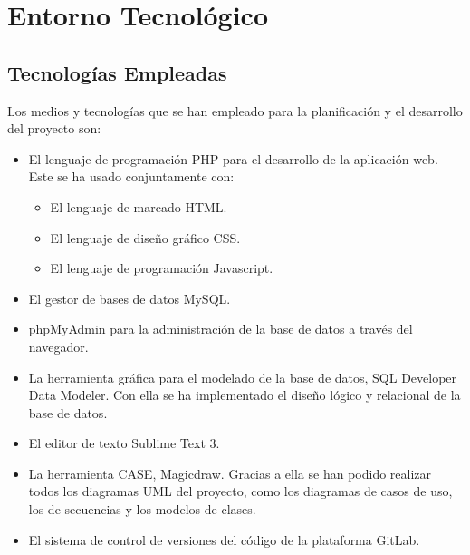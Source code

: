 \chapter{Entorno Tecnol\'ogico}

\section{Tecnolog\'ias Empleadas}
Los medios y tecnologías que se han empleado para la planificación y el desarrollo del proyecto son:
\begin{itemize}
	\item El lenguaje de programación PHP para el desarrollo de la aplicación web. Este se ha usado conjuntamente con:
		\begin{itemize}
			\item El lenguaje de marcado HTML.
			\item El lenguaje de diseño gráfico CSS.
			\item El lenguaje de programación Javascript.
		\end{itemize}
	\item El gestor de bases de datos MySQL.
	\item phpMyAdmin para la administración de la base de datos a través del navegador.
	\item La herramienta gráfica para el modelado de la base de datos, SQL Developer Data Modeler. Con ella se ha implementado el diseño lógico y relacional de la base de datos.
	\item El editor de texto Sublime Text 3.
	\item La herramienta CASE, Magicdraw. Gracias a ella se han podido realizar todos los diagramas UML del proyecto, como los diagramas de casos de uso, los de secuencias y los modelos de clases.
	\item El sistema de control de versiones del código de la plataforma GitLab.
\end{itemize}
